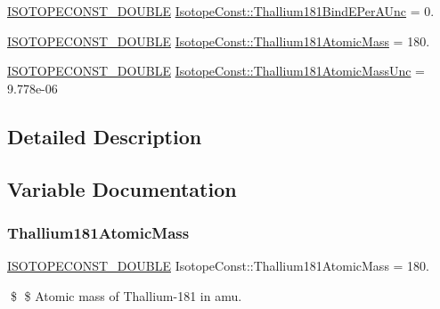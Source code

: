 \begin{DoxyCompactItemize}
\mbox{\hyperlink{group___isotope_const-_macros_ga8f45a7272ce02c0b4c65c44636ed719a}{I\+S\+O\+T\+O\+P\+E\+C\+O\+N\+S\+T\+\_\+\+D\+O\+U\+B\+LE}} \mbox{\hyperlink{group___isotope_const-_thallium-_tl181_gad97d848a525e741a5635c48c98a023f9}{Isotope\+Const\+::\+Thallium181\+Bind\+E\+Per\+A\+Unc}} = 0.
\item 
\mbox{\hyperlink{group___isotope_const-_macros_ga8f45a7272ce02c0b4c65c44636ed719a}{I\+S\+O\+T\+O\+P\+E\+C\+O\+N\+S\+T\+\_\+\+D\+O\+U\+B\+LE}} \mbox{\hyperlink{group___isotope_const-_thallium-_tl181_gaf8577239aa6cf5bdc0e05148247a572e}{Isotope\+Const\+::\+Thallium181\+Atomic\+Mass}} = 180.
\item 
\mbox{\hyperlink{group___isotope_const-_macros_ga8f45a7272ce02c0b4c65c44636ed719a}{I\+S\+O\+T\+O\+P\+E\+C\+O\+N\+S\+T\+\_\+\+D\+O\+U\+B\+LE}} \mbox{\hyperlink{group___isotope_const-_thallium-_tl181_ga49c04aa352175aed942749243012a0f1}{Isotope\+Const\+::\+Thallium181\+Atomic\+Mass\+Unc}} = 9.\+778e-\/06
\end{DoxyCompactItemize}


\subsection{Detailed Description}


\subsection{Variable Documentation}
\mbox{\label{group___isotope_const-_thallium-_tl181_gaf8577239aa6cf5bdc0e05148247a572e}} 
\subsubsection{\texorpdfstring{Thallium181\+Atomic\+Mass}{Thallium181AtomicMass}}
{\footnotesize\ttfamily \mbox{\hyperlink{group___isotope_const-_macros_ga8f45a7272ce02c0b4c65c44636ed719a}{I\+S\+O\+T\+O\+P\+E\+C\+O\+N\+S\+T\+\_\+\+D\+O\+U\+B\+LE}} Isotope\+Const\+::\+Thallium181\+Atomic\+Mass = 180.}

\$ \$ Atomic mass of Thallium-\/181 in amu. \mbox{\label{group___isotope_const-_thallium-_tl181_ga49c04aa352175aed942749243012a0f1}} 
